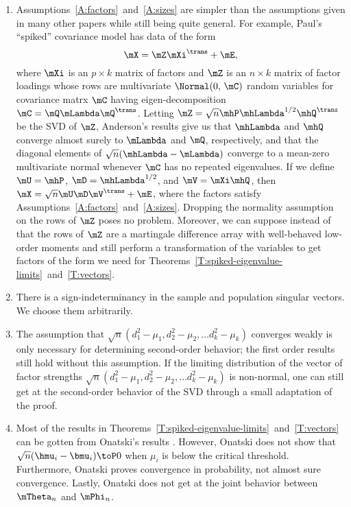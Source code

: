 \begin{enumerate}
    
\item
Assumptions~\ref{A:factors}~and~\ref{A:sizes} are simpler than the assumptions given in many other papers while still being quite general.  For example, Paul's ``spiked'' covariance model has data of the form
\[
    \mX = \mZ \mXi^\trans + \mE,
\]
where $\mXi$ is an $p \times k$ matrix of factors and $\mZ$ is an $n\times k$ matrix of factor loadings whose rows are \iid multivariate $\Normal(0,\, \mC)$ random variables for covariance matrx $\mC$ having eigen-decomposition $\mC = \mQ \mLambda \mQ^\trans$.  Letting $\mZ = \sqrt{n} \mhP \mhLambda^{1/2} \mhQ^\trans$ be the SVD of $\mZ$, Anderson's results \cite{anderson1963atp} give us that $\mhLambda$ and $\mhQ$ converge almost surely to $\mLambda$ and $\mQ$, respectively, and that the diagonal elements of $\sqrt{n} (\mhLambda - \mLambda)$ converge to a mean-zero multivariate normal whenever $\mC$ has no repeated eigenvalues.  If we define $\mU = \mhP$, $\mD = \mhLambda^{1/2}$, and $\mV = \mXi \mhQ$, then $\mX = \sqrt{n} \mU \mD \mV^\trans + \mE$, where the factors satisfy Assumptions~\ref{A:factors}~and~\ref{A:sizes}.  Dropping the normality assumption on the rows of $\mZ$ poses no problem.  Moreover, we can suppose instead of \iid that the rows of $\mZ$ are a martingale difference array with well-behaved low-order moments and still perform a transformation of the variables to get factors of the form we need for Theorems~\ref{T:spiked-eigenvalue-limits}~and~\ref{T:vectors}.

\item
There is a sign-indeterminancy in the sample and population singular vectors. We choose them arbitrarily.

\item
The assumption that
\(
    \sqrt{n}
    \left(
        d_1^2 - \mu_1,
        d_2^2 - \mu_2,
        \ldots
        d_k^2 - \mu_k
    \right)
\)
converges weakly is only necessary for determining second-order
behavior; the first order results still hold without this assumption.  If
the limiting distribution of the vector of factor strengths
\(
    \sqrt{n}
    \left(
        d_1^2 - \mu_1,
        d_2^2 - \mu_2,
        \ldots
        d_k^2 - \mu_k
    \right)
\)
is non-normal, one can still get at the second-order behavior of the SVD 
through a small adaptation of the proof.

\item 
Most of the results in Theorems~\ref{T:spiked-eigenvalue-limits}~and~\ref{T:vectors} can be gotten from Onatski's results \cite{onatski2009}.   However, Onatski does not show that $\sqrt{n} (\hmu_i - \bmu_i) \toP 0$ when $\mu_i$ is below the critical threshold.  Furthermore, Onatski proves convergence in probability, not almost sure convergence.  Lastly, Onatski does not get at the joint behavior between $\mTheta_n$ and $\mPhi_n$.

\end{enumerate}

